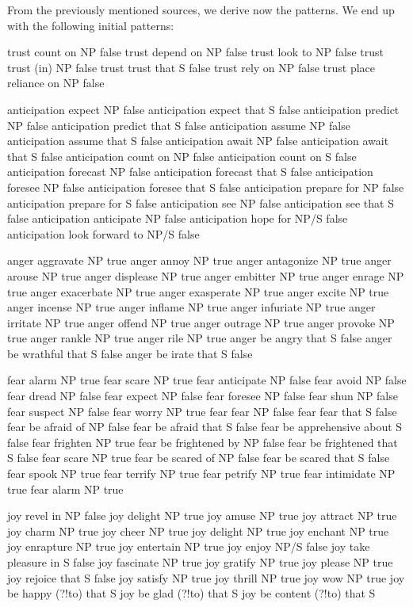 From the previously mentioned sources, we derive now the patterns. We end up with the following initial patterns:

trust	count on	NP	false
trust	depend on	NP	false
trust	look to	NP	false
trust	trust (in)	NP	false
trust	trust that	S	false
trust	rely on	NP	false
trust	place reliance on	NP	false

anticipation	expect	NP	false
anticipation	expect that	S	false
anticipation	predict	NP	false
anticipation	predict that	S	false
anticipation	assume NP	false
anticipation	assume that	S	false
anticipation	await	NP	false
anticipation	await	that S	false
anticipation	count on	NP	false
anticipation	count on	S	false
anticipation	forecast	NP	false
anticipation	forecast that S	false
anticipation	foresee	NP	false
anticipation	foresee that	S	false
anticipation	prepare for	NP	false
anticipation	prepare for	S	false
anticipation	see	NP	false
anticipation	see that	S	false
anticipation	anticipate	NP	false
anticipation	hope for	NP/S	false
anticipation	look forward to	NP/S	false


anger	aggravate	NP	true
anger	annoy	NP	true
anger	antagonize	NP	true
anger	arouse	NP	true
anger	displease	NP	true
anger	embitter	NP	true
anger	enrage	NP	true
anger	exacerbate	NP	true
anger	exasperate	NP	true
anger	excite	NP	true
anger	incense	NP	true
anger	inflame	NP	true
anger	infuriate	NP	true
anger	irritate		NP	true
anger	offend	NP	true
anger	outrage	NP	true
anger	provoke	NP	true
anger	rankle	NP	true
anger	rile	NP	true
anger	be angry that	S	false
anger	be wrathful that	S	false
anger	be irate that	S	false

fear	alarm	NP	true
fear	scare	NP	true
fear	anticipate	NP	false
fear	avoid	NP	false
fear	dread	NP	false
fear	expect	NP	false
fear	foresee	NP	false
fear	shun	NP	false
fear	suspect	NP	false
fear	worry	NP	true
fear	fear	NP	false
fear	fear that	S	false
fear	be afraid of	NP	false
fear	be afraid that	S	false
fear	be apprehensive about	S	false
fear	frighten	NP	true
fear	be frightened by	NP	false
fear	be frightened that	S	false
fear	scare	NP	true
fear	be scared of	NP	false
fear	be scared that	S	false
fear	spook	NP	true
fear	terrify	NP	true
fear	petrify	NP	true
fear	intimidate	NP	true
fear	alarm	NP	true

joy	revel in	NP	false
joy	delight	NP	true
joy	amuse	NP	true
joy	attract	NP	true
joy	charm	NP	true
joy	cheer	NP	true
joy	delight	NP	true
joy	enchant	NP	true
joy	enrapture	NP	true
joy	entertain	NP	true
joy	enjoy	NP/S	false
joy	take pleasure in	S	false
joy	fascinate	NP	true
joy	gratify	NP	true
joy	please	NP	true
joy	rejoice	that	S	false
joy	satisfy	NP	true
joy	thrill	NP	true
joy	wow	NP	true
joy	be happy (?!to) that	S
joy	be glad (?!to) that	S
joy	be content (?!to) that	S


